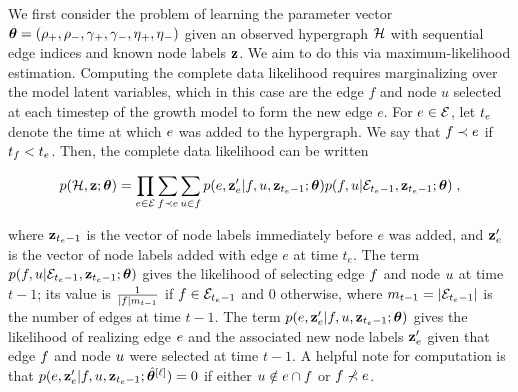 \documentclass[aps,pre,reprint,superscriptaddress,nofootinbib]{revtex4-2}
\begin{document}
    We first consider the problem of learning the parameter vector $\boldsymbol{\theta} = (\rho{}_+, \rho{}_-, \gamma{}_+, \gamma{}_-, \eta{}_+, \eta{}_-)$ given an observed hypergraph $\mathcal{H}$ with sequential edge indices and known node labels $\mathbf{z}$.
    We aim to do this via maximum-likelihood estimation. 
    Computing the complete data likelihood requires marginalizing over the model latent variables, which in this case are the edge $f$ and node $u$ selected at each timestep of the growth model to form the new edge $e$. 
    For $e \in \mathcal{E}$, let $t_e$ denote the time at which $e$ was added to the hypergraph.
    We say that $f \prec e$ if $t_{f} < t_{e}$. 
    Then, the complete data likelihood can be written 
    \begin{widetext}
    \begin{align}
        p(\mathcal{H}, \mathbf{z} ; \boldsymbol{\theta}) = \prod_{e \in \mathcal{E}} \sum_{f \prec e} \sum_{u \in f} p(e, \mathbf{z}'_e | f, u, \mathbf{z}_{t_e-1}; \boldsymbol{\theta}) p(f,u | \mathcal{E}_{t_e-1}, \mathbf{z}_{t_e-1}; \boldsymbol{\theta}) \;, \label{eq:likelihood}
    \end{align}
\end{widetext}
    where $\mathbf{z}_{t_e-1}$ is the vector of node labels immediately before $e$ was added, and $\mathbf{z}'_e$ is the vector of node labels added with edge $e$ at time $t_e$.
    The term $p(f,u | \mathcal{E}_{t_e-1}, \mathbf{z}_{t_e-1}; \boldsymbol{\theta})$ gives the likelihood of selecting edge $f$ and node $u$ at time $t - 1$; its value is $\frac{1}{\left| f \right|m_{t-1}}$ if $f \in \mathcal{E}_{t_e-1}$ and $0$ otherwise, where $m_{t-1} = \left| \mathcal{E}_{t_e-1} \right|$ is the number of edges at time $t - 1$.
    The term $p(e, \mathbf{z}'_e | f, u, \mathbf{z}_{t_e-1}; \boldsymbol{\theta})$ gives the likelihood of realizing edge $e$ and the associated new node labels $\mathbf{z}'_e$ given that edge $f$ and node $u$ were selected at time $t - 1$.
    A helpful note for computation is that $p(e, \mathbf{z}'_e | f, u, \mathbf{z}_{t_e-1}; \hat{\boldsymbol{\theta}}^{[\ell]}) = 0$ if either $u \notin e\cap f$ or $f\not\prec e$. 
\end{document}
